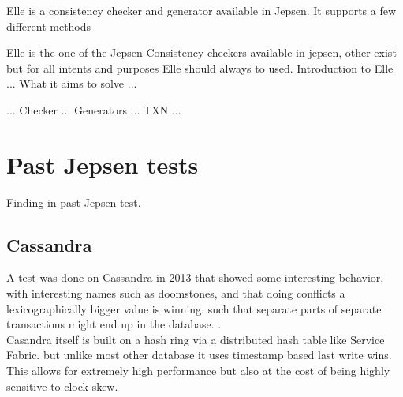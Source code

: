 \documentclass[a4paper,10pt,titlepage]{report}
\begin{document}
    
    Elle is a consistency checker and generator available in Jepsen. It supports a few different methods 
    
    Elle is the one of the Jepsen Consistency checkers available in jepsen, other exist but for all intents and purposes Elle should always to used. 
    Introduction to Elle
    ...
    What it aims to solve
    ...

    ...
    Checker
    ...
    Generators
    ...
    TXN
    ...
    




    
    
    
    

    \section{Past Jepsen tests}
        Finding in past Jepsen test.
    \subsection{Cassandra}
    A test was done on Cassandra in 2013 that showed some interesting behavior, with interesting names such as doomstones, and that doing conflicts a lexicographically bigger value is winning. such that separate parts of separate transactions might end up in the database. .\\
    \vspace{5mm}
    Casandra itself is built on a hash ring via a distributed hash table like Service Fabric. but unlike most other database it uses timestamp based last write wins. This allows for extremely high performance but also at the cost of being highly sensitive to clock skew.\\
    
\end{document}
